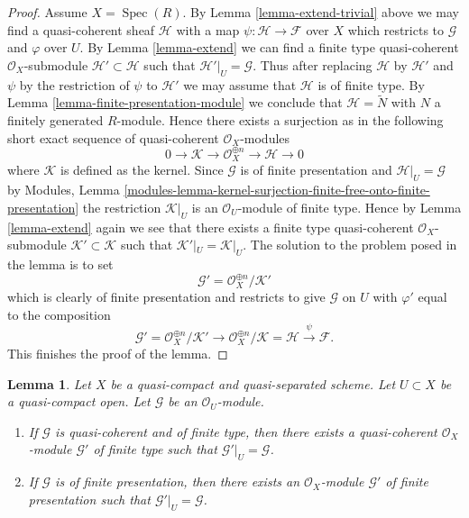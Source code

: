 \documentclass{stacks-project}
\theoremstyle{plain}
\newtheorem{lemma}[subsection]{Lemma}
\theoremstyle{definition}
\theoremstyle{remark}
\numberwithin{equation}{subsection}
\def\Spec{\mathop{\mathrm{Spec}}}
\begin{document}
\begin{proof}
\medskip\noindent
Assume $X = \Spec(R)$.
By Lemma \ref{lemma-extend-trivial} above we may
find a quasi-coherent sheaf $\mathcal{H}$ with
a map $\psi : \mathcal{H} \to \mathcal{F}$ over $X$
which restricts to $\mathcal{G}$ and $\varphi$ over $U$.
By Lemma \ref{lemma-extend} we can find a finite type
quasi-coherent $\mathcal{O}_X$-submodule
$\mathcal{H}' \subset \mathcal{H}$
such that $\mathcal{H}'|_U = \mathcal{G}$. Thus after
replacing $\mathcal{H}$ by $\mathcal{H}'$
and $\psi$ by the restriction of $\psi$ to $\mathcal{H}'$
we may assume that $\mathcal{H}$ is of finite type.
By Lemma \ref{lemma-finite-presentation-module}
we conclude that $\mathcal{H} = \widetilde{N}$ with
$N$ a finitely generated $R$-module. Hence there exists a surjection
as in the following short exact sequence of
quasi-coherent $\mathcal{O}_X$-modules
$$
0 \to \mathcal{K} \to \mathcal{O}_X^{\oplus n} \to \mathcal{H} \to 0
$$
where $\mathcal{K}$ is defined as the kernel.
Since $\mathcal{G}$ is of finite presentation and
$\mathcal{H}|_U = \mathcal{G}$ by
Modules, Lemma
\ref{modules-lemma-kernel-surjection-finite-free-onto-finite-presentation}
the restriction $\mathcal{K}|_U$ is
an $\mathcal{O}_U$-module of finite type. Hence by Lemma \ref{lemma-extend}
again we see that there exists a finite type quasi-coherent
$\mathcal{O}_X$-submodule $\mathcal{K}' \subset \mathcal{K}$ such
that $\mathcal{K}'|_U = \mathcal{K}|_U$. The solution to the problem
posed in the lemma is to set
$$
\mathcal{G}' = \mathcal{O}_X^{\oplus n}/\mathcal{K}'
$$
which is clearly of finite presentation and restricts to give $\mathcal{G}$
on $U$ with $\varphi'$ equal to the composition
$$
\mathcal{G}' = \mathcal{O}_X^{\oplus n}/\mathcal{K}'
\to \mathcal{O}_X^{\oplus n}/\mathcal{K} = \mathcal{H} \xrightarrow{\psi}
\mathcal{F}.
$$
This finishes the proof of the lemma.
\end{proof}

\begin{lemma}
\label{lemma-lift-finite-presentation}
Let $X$ be a quasi-compact and quasi-separated scheme. Let $U \subset X$
be a quasi-compact open. Let $\mathcal{G}$ be an $\mathcal{O}_U$-module.
\begin{enumerate}
\item If $\mathcal{G}$ is quasi-coherent and of finite type, then
there exists a quasi-coherent $\mathcal{O}_X$-module $\mathcal{G}'$
of finite type such that $\mathcal{G}'|_U = \mathcal{G}$.
\item If $\mathcal{G}$ is of finite presentation, then
there exists an $\mathcal{O}_X$-module $\mathcal{G}'$
of finite presentation such that $\mathcal{G}'|_U = \mathcal{G}$.
\end{enumerate}
\end{lemma}
\end{document}
